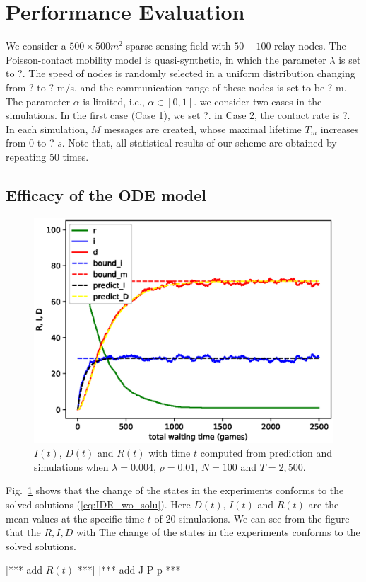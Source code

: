 \section{Performance Evaluation}
We consider a $500 \times 500 m^2$ sparse sensing field with
$50-100$ relay nodes.
The Poisson-contact
mobility model is quasi-synthetic,
in which the parameter $\lambda$ is set to ?.
The speed of nodes is randomly selected in a uniform distribution changing from ? to ? m/s,
and the communication range of
these nodes is set to be ? m.
The parameter $\alpha$ is limited, i.e.,
$\alpha \in [0, 1]$.
we consider two cases in the simulations.
In the first case (Case 1),
we set ?.
in Case 2,
the contact rate
is ?.
In each simulation,
$M$ messages are created, 
whose maximal lifetime $T_m$ increases from $0$ to ? $s$.
Note that, 
all statistical results of our scheme are obtained by
repeating 50 times.

\subsection{Efficacy of the ODE model}
\label{subsec:pe_valid}
\begin{figure}
  \includegraphics[width=.45\textwidth]{fig/twohop_without_detection.eps}
  \caption{$I(t)$, $D(t)$ and $R(t)$ with time $t$ computed from prediction and simulations
  when $\lambda = 0.004$, $\rho = 0.01$, $N=100$ and $T=2,500$.}
  \label{fig:twohop_predict_wod}
\end{figure}
Fig.~\ref{fig:twohop_predict_wod} shows that the change of the states
in the experiments conforms to the solved solutions (\ref{eq:IDR_wo_solu}).
Here $D(t)$, $I(t)$ and $R(t)$ are the mean values
at the specific time $t$ of $20$ simulations.
We can see from the figure that the $R,I,D$ with
The change of the states
in the experiments conforms to
the solved solutions.

[*** add $R(t)$ ***]
[*** add J P p ***]

